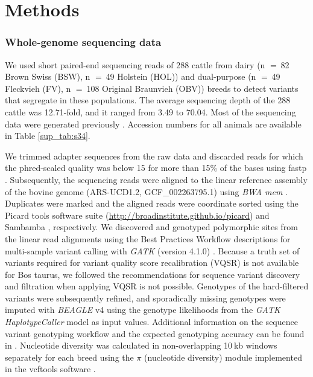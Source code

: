 \documentclass[../main.tex]{subfiles}
\begin{document}
\section{Methods}

\subsubsection*{Whole-genome sequencing data}

We used short paired-end sequencing reads of 288 cattle from dairy (n $=$ 82 Brown Swiss (BSW), n $=$ 49 Holstein (HOL)) and dual-purpose (n $=$ 49 Fleckvieh (FV), n $=$ 108 Original Braunvieh (OBV)) breeds to detect variants that segregate in these populations. The average sequencing depth of the 288 cattle was 12.71-fold, and it ranged from 3.49 to 70.04. Most of the sequencing data were generated previously \citep{daetwyler2014whole,crysnanto2019accurate,jansen2013assessment,baes2014evaluation,hofstetter2019non}. Accession numbers for all animals are available in Table \ref{sup_tab:s34}.

We trimmed adapter sequences from the raw data and discarded reads for which the phred-scaled quality was below 15 for more than 15\% of the bases using fastp \citep{chen2018fastp}. Subsequently, the sequencing reads were aligned to the linear reference assembly of the bovine genome (ARS-UCD1.2, GCF\_002263795.1) using \emph{BWA mem} \citep{li2013aligning}. 
Duplicates were marked and the aligned reads were coordinate sorted using the Picard tools software suite (\url{http://broadinstitute.github.io/picard}) and Sambamba \citep{tarasov2015sambamba}, respectively. We discovered and genotyped polymorphic sites from the linear read alignments using the Best Practices Workflow descriptions for multi-sample variant calling with \emph{GATK} (version 4.1.0) \citep{depristo2011framework}. Because a truth set of variants required for variant quality score recalibration (VQSR) is not available for Bos taurus, we followed the recommendations for sequence variant discovery and filtration when applying VQSR is not possible. Genotypes of the hard-filtered variants were subsequently refined, and sporadically missing genotypes were imputed with \emph{BEAGLE} v4 \citep{browning2016genotype} using the genotype likelihoods from the \emph{GATK HaplotypeCaller} model as input values. Additional information on the sequence variant genotyping workflow and the expected genotyping accuracy can be found in \citep{crysnanto2019accurate}. Nucleotide diversity was calculated in non-overlapping 10 kb windows separately for each breed using the $\pi$ (nucleotide diversity) module implemented in the vcftools software \citep{danecek2011variant}.
\end{document}
